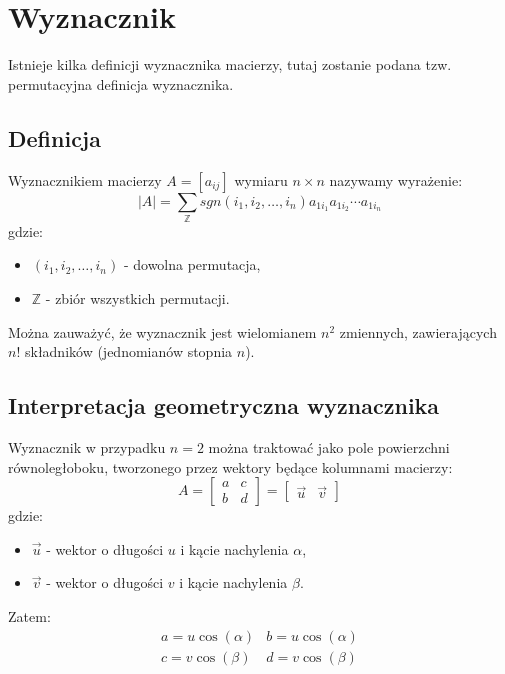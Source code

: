 \documentclass{article}
\begin{document}
\section{Wyznacznik}
Istnieje kilka definicji wyznacznika macierzy, tutaj zostanie 
podana tzw. permutacyjna definicja wyznacznika. 
\subsection{Definicja}
Wyznacznikiem macierzy $A = [a_{ij}]$ wymiaru $n \times n$ nazywamy
wyrażenie:
$$
    |A| = \sum_{\mathbb{Z}}{sgn(i_{1},i_{2},\dots,i_{n})
        a_{1i_{1}}a_{1i_{2}}\cdots a_{1i_{n}}}
$$
gdzie:
\begin{itemize}
    \item $(i_{1},i_{2},\dots,i_{n})$ - dowolna permutacja,
    \item $\mathbb{Z}$ - zbiór wszystkich permutacji.
\end{itemize}

Można zauważyć, że wyznacznik jest wielomianem $n^{2}$ zmiennych,
zawierających $n!$ składników (jednomianów stopnia $n$).

\subsection{Interpretacja geometryczna wyznacznika}
Wyznacznik w przypadku $n=2$ można traktować jako pole powierzchni
równoległoboku, tworzonego przez wektory będące kolumnami macierzy:
$$
    A = 
    \begin{bmatrix} a & c \\ b & d \end{bmatrix}
    =
    \begin{bmatrix} \vec{u} & \vec{v} \end{bmatrix}
$$
gdzie:
\begin{itemize}
    \item $\vec{u}$ - wektor o długości $u$ i kącie nachylenia $\alpha$,
    \item $\vec{v}$ - wektor o długości $v$ i kącie nachylenia $\beta$.
\end{itemize}
Zatem:
$$
    \begin{array}{ll}
        a = u \cos(\alpha) & b = u \cos(\alpha)\\
        c = v \cos(\beta) & d = v \cos(\beta)
    \end{array}
$$
\end{document}
